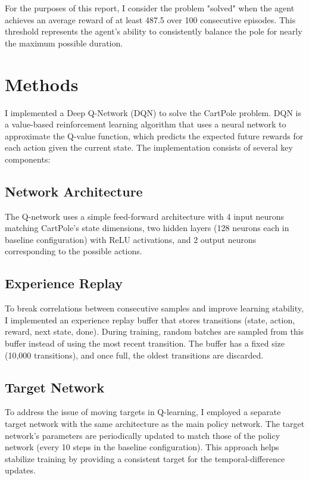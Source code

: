 \documentclass{article}
\begin{document}
For the purposes of this report, I consider the problem "solved" when the agent achieves an average reward of at least 487.5 over 100 consecutive episodes. This threshold represents the agent's ability to consistently balance the pole for nearly the maximum possible duration.

\section{Methods}
I implemented a Deep Q-Network (DQN) to solve the CartPole problem. DQN is a value-based reinforcement learning algorithm that uses a neural network to approximate the Q-value function, which predicts the expected future rewards for each action given the current state. The implementation consists of several key components:

\subsection{Network Architecture}
The Q-network uses a simple feed-forward architecture with 4 input neurons matching CartPole's state dimensions, two hidden layers (128 neurons each in baseline configuration) with ReLU activations, and 2 output neurons corresponding to the possible actions.

\subsection{Experience Replay}
To break correlations between consecutive samples and improve learning stability, I implemented an experience replay buffer \cite{mnih2013} that stores transitions (state, action, reward, next state, done). During training, random batches are sampled from this buffer instead of using the most recent transition. The buffer has a fixed size (10,000 transitions), and once full, the oldest transitions are discarded.

\subsection{Target Network}
To address the issue of moving targets in Q-learning, I employed a separate target network \cite{mnih2015} with the same architecture as the main policy network. The target network's parameters are periodically updated to match those of the policy network (every 10 steps in the baseline configuration). This approach helps stabilize training by providing a consistent target for the temporal-difference updates.
\end{document}
